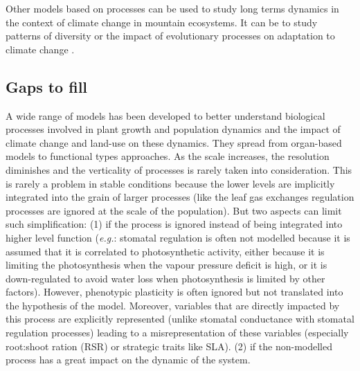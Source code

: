 Other models based on processes can be used to study long terms dynamics in the context of climate change in mountain ecosystems. It can be to study patterns of diversity \parencite{boulangeat_fate-hd_2014} or the impact of evolutionary processes on adaptation to climate change \parencite{cotto_dynamic_2017}.






\subsection{Gaps to fill}

A wide range of models has been developed to better understand biological processes involved in plant growth and population dynamics and the impact of climate change and land-use on these dynamics. They spread from organ-based models to functional types approaches. As the scale increases, the resolution diminishes and the verticality of processes is rarely taken into consideration. This is rarely a problem in stable conditions because the lower levels are implicitly integrated into the grain of larger processes (like the leaf gas exchanges regulation processes are ignored at the scale of the population). But two aspects can limit such simplification: (1) if the process is ignored instead of being integrated into higher level function (\textit{e.g.}: stomatal regulation is often not modelled because it is assumed that it is correlated to photosynthetic activity, either because it is limiting the photosynthesis when the vapour pressure deficit is high, or it is down-regulated to avoid water loss when photosynthesis is limited by other factors). However, phenotypic plasticity is often ignored but not translated into the hypothesis of the model. Moreover, variables that are directly impacted by this process are explicitly represented (unlike stomatal conductance with stomatal regulation processes) leading to a misrepresentation of these variables (especially root:shoot ration (RSR) or strategic traits like SLA). (2) if the non-modelled process has a great impact on the dynamic of the system. 


